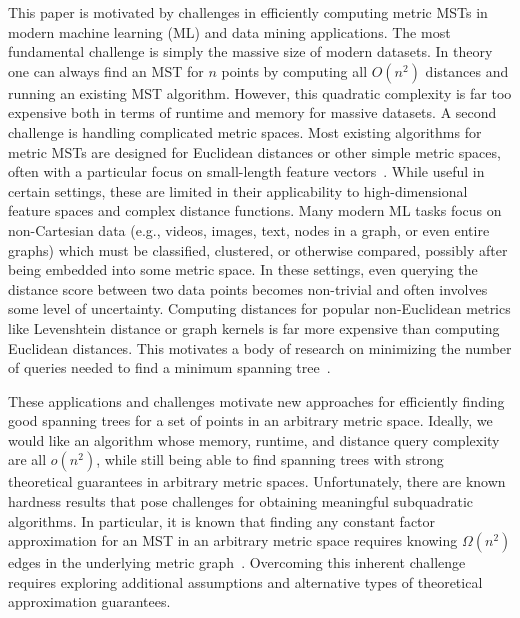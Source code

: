 This paper is motivated by challenges in efficiently computing metric MSTs in modern machine learning (ML) and data mining applications. The most fundamental challenge is simply the massive size of modern datasets. In theory one can always find an MST for $n$ points by computing all $O(n^2)$ distances and running an existing MST algorithm. However, this quadratic complexity is far too expensive both in terms of runtime and memory for massive datasets. 
A second challenge is handling complicated metric spaces. Most existing algorithms for metric MSTs are designed for Euclidean distances or other simple metric spaces, often with a particular focus on small-length feature vectors~\cite{march2010fast,agarwal1990euclidean,shamos1975closest,vaidya1988minimum,arya2016fast,wang2021fast}.
While useful in certain settings, these are limited in their applicability to high-dimensional feature spaces and complex distance functions. Many modern ML tasks focus on non-Cartesian data (e.g., videos, images, text, nodes in a graph, or even entire graphs) which must be classified, clustered, or otherwise compared, possibly after being embedded into some metric space. In these settings, even querying the distance score between two data points becomes non-trivial and often involves some level of uncertainty. 
Computing distances for popular non-Euclidean metrics like Levenshtein distance or graph kernels is far more expensive than computing Euclidean distances.
This motivates a body of research on minimizing the number of queries needed to find a minimum spanning tree~\cite{bateni2024metric,erlebach2022learning,hoffman2008computing,megow2017randomization}. 
%

These applications and challenges motivate new approaches for efficiently finding good spanning trees for a set of points in an arbitrary metric space. Ideally, we would like an algorithm whose memory, runtime, and distance query complexity are all $o(n^2)$, while still being able to find spanning trees with strong theoretical guarantees in arbitrary metric spaces. 
Unfortunately,
there are known hardness results that pose challenges for obtaining meaningful subquadratic algorithms. In particular, it is known that finding any constant factor approximation for an MST in an arbitrary metric space requires 
knowing $\Omega(n^2)$ edges in the underlying metric graph~\cite{indyk1999sublinear}. Overcoming this inherent challenge requires exploring additional assumptions and alternative types of theoretical approximation guarantees.

